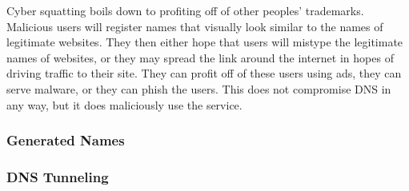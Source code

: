 Cyber squatting boils down to profiting off of other peoples' trademarks.
Malicious users will register names that visually look similar to the names of legitimate websites.
They then either hope that users will mistype the legitimate names of websites, or they may spread
the link around the internet in hopes of driving traffic to their site.
They can profit off of these users using ads, they can serve malware, or they can phish the users.
This does not compromise DNS in any way, but it does maliciously use the service.

\subsubsection{Generated Names}

\subsubsection{DNS Tunneling}
